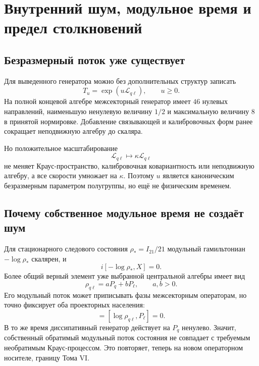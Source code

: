 \chapter{Внутренний шум, модульное время и предел столкновений}
\label{ch:v8-intrinsic-noise-clock-dilation-gate}

\section{Безразмерный поток уже существует}

Для выведенного генератора можно без дополнительных структур записать
\begin{equation}
 T_u=\exp(u\mathcal L_{q\ell}),
 \qquad u\geq0.
 \label{eq:v8-dimensionless-lindblad-flow}
\end{equation}
На полной концевой алгебре межсекторный генератор имеет $46$ нулевых направлений,
наименьшую ненулевую величину $1/2$ и максимальную величину $8$ в принятой
нормировке. Добавление связывающей и калибровочных форм ранее сокращает неподвижную
алгебру до скаляра.

Но положительное масштабирование
\begin{equation}
 \mathcal L_{q\ell}\longmapsto\kappa\mathcal L_{q\ell}
 \label{eq:v8-rate-rescaling}
\end{equation}
не меняет Краус-пространство, калибровочная ковариантность или неподвижную
алгебру, а все скорости умножает на $\kappa$. Поэтому $u$ является
каноническим безразмерным параметром полугруппы, но ещё не физическим
временем.

\section{Почему собственное модульное время не создаёт шум}

Для стационарного следового состояния $\rho_*=I_{21}/21$ модульный
гамильтониан $-\log\rho_*$ скалярен, и
\begin{equation}
 i[-\log\rho_*,X]=0.
\end{equation}
Более общий верный элемент уже выбранной центральной алгебры имеет вид
\begin{equation}
 \rho_{q\ell}=aP_q+bP_\ell,
 \qquad a,b>0.
\end{equation}
Его модульный поток может приписывать фазы межсекторным операторам, но
точно фиксирует оба проекторных населения:
\begin{equation}
 [\log\rho_{q\ell},P_q]
 = [\log\rho_{q\ell},P_\ell]=0.
\end{equation}
В то же время диссипативный генератор действует на $P_q$ ненулево. Значит,
собственный обратимый модульный поток состояния не совпадает с требуемым
необратимым Краус-процессом. Это повторяет, теперь на новом операторном
носителе, границу Тома VI.

